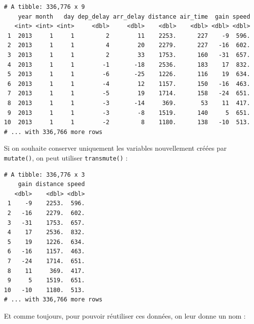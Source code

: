 \documentclass[
  a4paper,
]{article}
\newenvironment{Shaded}{\begin{snugshade}}{\end{snugshade}}
\newcommand{\DataTypeTok}[1]{\textcolor[rgb]{0.00,0.34,0.68}{#1}}
\newcommand{\DecValTok}[1]{\textcolor[rgb]{0.69,0.50,0.00}{#1}}
\newcommand{\FloatTok}[1]{\textcolor[rgb]{0.69,0.50,0.00}{#1}}
\newcommand{\KeywordTok}[1]{\textcolor[rgb]{0.12,0.11,0.11}{\textbf{#1}}}
\newcommand{\NormalTok}[1]{\textcolor[rgb]{0.12,0.11,0.11}{#1}}
\newcommand{\OperatorTok}[1]{\textcolor[rgb]{0.12,0.11,0.11}{#1}}
\newcommand{\StringTok}[1]{\textcolor[rgb]{0.75,0.01,0.01}{#1}}
\begin{document}
\begin{verbatim}
# A tibble: 336,776 x 9
    year month   day dep_delay arr_delay distance air_time  gain speed
   <int> <int> <int>     <dbl>     <dbl>    <dbl>    <dbl> <dbl> <dbl>
 1  2013     1     1         2        11    2253.      227    -9  596.
 2  2013     1     1         4        20    2279.      227   -16  602.
 3  2013     1     1         2        33    1753.      160   -31  657.
 4  2013     1     1        -1       -18    2536.      183    17  832.
 5  2013     1     1        -6       -25    1226.      116    19  634.
 6  2013     1     1        -4        12    1157.      150   -16  463.
 7  2013     1     1        -5        19    1714.      158   -24  651.
 8  2013     1     1        -3       -14     369.       53    11  417.
 9  2013     1     1        -3        -8    1519.      140     5  651.
10  2013     1     1        -2         8    1180.      138   -10  513.
# ... with 336,766 more rows
\end{verbatim}

Si on souhaite conserver uniquement les variables nouvellement créées par \texttt{mutate()}, on peut utiliser \texttt{transmute()} :

\begin{Shaded}
\end{Shaded}

\begin{verbatim}
# A tibble: 336,776 x 3
    gain distance speed
   <dbl>    <dbl> <dbl>
 1    -9    2253.  596.
 2   -16    2279.  602.
 3   -31    1753.  657.
 4    17    2536.  832.
 5    19    1226.  634.
 6   -16    1157.  463.
 7   -24    1714.  651.
 8    11     369.  417.
 9     5    1519.  651.
10   -10    1180.  513.
# ... with 336,766 more rows
\end{verbatim}

Et comme toujours, pour pouvoir réutiliser ces données, on leur donne un nom :

\begin{Shaded}
\end{Shaded}
\end{document}

